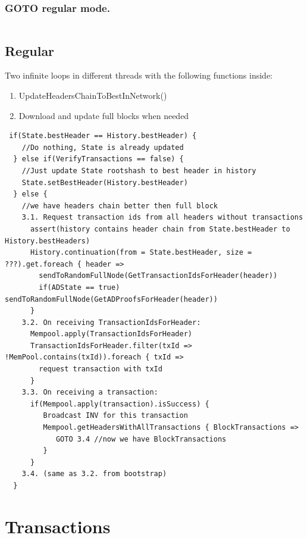 \documentclass[]{article}   %
\begin{document}
\subsubsection{GOTO regular mode.}
\begin{verbatim}

\end{verbatim}
\subsection{Regular}
Two infinite loops in different threads with the following functions inside:
\begin{enumerate}
\item UpdateHeadersChainToBestInNetwork()
\item Download and update full blocks when needed
\end{enumerate}
\begin{verbatim}
 if(State.bestHeader == History.bestHeader) {
    //Do nothing, State is already updated
  } else if(VerifyTransactions == false) {
    //Just update State rootshash to best header in history
    State.setBestHeader(History.bestHeader)
  } else {
    //we have headers chain better then full block
    3.1. Request transaction ids from all headers without transactions
      assert(history contains header chain from State.bestHeader to History.bestHeaders)
      History.continuation(from = State.bestHeader, size = ???).get.foreach { header =>
        sendToRandomFullNode(GetTransactionIdsForHeader(header))
        if(ADState == true) sendToRandomFullNode(GetADProofsForHeader(header))
      }
    3.2. On receiving TransactionIdsForHeader:
      Mempool.apply(TransactionIdsForHeader)
      TransactionIdsForHeader.filter(txId => !MemPool.contains(txId)).foreach { txId =>
        request transaction with txId
      }
    3.3. On receiving a transaction:
      if(Mempool.apply(transaction).isSuccess) {
         Broadcast INV for this transaction
         Mempool.getHeadersWithAllTransactions { BlockTransactions =>
            GOTO 3.4 //now we have BlockTransactions
         }
      }
    3.4. (same as 3.2. from bootstrap)
  }
\end{verbatim}






\section{Transactions}
\end{document}

